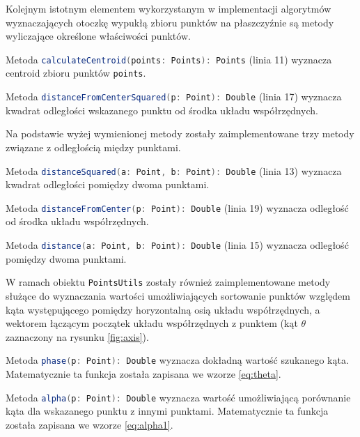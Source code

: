    		
   		\newpage
   		Kolejnym istotnym elementem wykorzystanym w implementacji algorytmów wyznaczających otoczkę wypukłą zbioru punktów na płaszczyźnie są metody wyliczające określone właściwości punktów.
   		
   		Metoda \lstinline[language=scala]{calculateCentroid(points: Points): Points} (linia 11) wyznacza centroid zbioru punktów \lstinline[language=scala]{points}.
   		
   		Metoda \lstinline[language=scala]{distanceFromCenterSquared(p: Point): Double} (linia 17) wyznacza kwadrat odległości wskazanego punktu od środka układu współrzędnych.
   		
   		Na podstawie wyżej wymienionej metody zostały zaimplementowane trzy metody związane z odległością między punktami.
   		
   		Metoda \lstinline[language=scala]{distanceSquared(a: Point, b: Point): Double} (linia 13) wyznacza kwadrat odległości pomiędzy dwoma punktami.
   		
   		Metoda \lstinline[language=scala]{distanceFromCenter(p: Point): Double} (linia 19) wyznacza odległość od środka układu współrzędnych.
   		
   		Metoda \lstinline[language=scala]{distance(a: Point, b: Point): Double} (linia 15) wyznacza odległość pomiędzy dwoma punktami.

		W ramach obiektu \lstinline[language=scala]{PointsUtils} zostały również zaimplementowane metody służące do wyznaczania wartości umożliwiających sortowanie punktów względem kąta występującego pomiędzy horyzontalną osią układu współrzędnych, a wektorem łączącym początek układu współrzędnych z punktem (kąt $\theta$ zaznaczony na rysunku \ref{fig:axis}).
		
		Metoda \lstinline[language=scala]{phase(p: Point): Double} wyznacza dokładną wartość szukanego kąta. Matematycznie ta funkcja została zapisana we wzorze \ref{eq:theta}.
		
		Metoda \lstinline[language=scala]{alpha(p: Point): Double} wyznacza wartość umożliwiającą porównanie kąta dla wskazanego punktu z innymi punktami. Matematycznie ta funkcja została zapisana we wzorze \ref{eq:alpha1}.
	
   		
   		
   		\newpage
   		
   		\newpage
   		
   		\newpage
   		
   		\newpage
